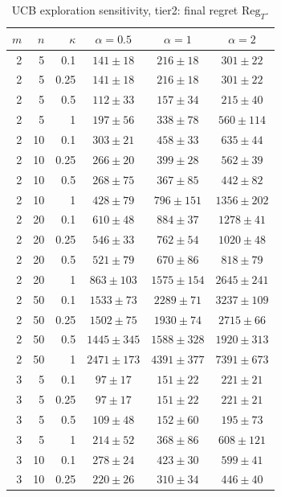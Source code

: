 \begin{table}[htbp]
\centering
\scriptsize
\caption{UCB exploration sensitivity, tier2: final regret $\mathrm{Reg}_T$.}
\label{tab:ucb_alpha_tier2_final_regret}
\begin{tabular}{@{}rrrccc@{}}
\toprule
$m$ & $n$ & $\kappa$ & $\alpha=0.5$ & $\alpha=1$ & $\alpha=2$ \\
\midrule
2 & 5 & 0.1 & $141 \pm 18$ & $216 \pm 18$ & $301 \pm 22$ \\
2 & 5 & 0.25 & $141 \pm 18$ & $216 \pm 18$ & $301 \pm 22$ \\
2 & 5 & 0.5 & $112 \pm 33$ & $157 \pm 34$ & $215 \pm 40$ \\
2 & 5 & 1 & $197 \pm 56$ & $338 \pm 78$ & $560 \pm 114$ \\
2 & 10 & 0.1 & $303 \pm 21$ & $458 \pm 33$ & $635 \pm 44$ \\
2 & 10 & 0.25 & $266 \pm 20$ & $399 \pm 28$ & $562 \pm 39$ \\
2 & 10 & 0.5 & $268 \pm 75$ & $367 \pm 85$ & $442 \pm 82$ \\
2 & 10 & 1 & $428 \pm 79$ & $796 \pm 151$ & $1356 \pm 202$ \\
2 & 20 & 0.1 & $610 \pm 48$ & $884 \pm 37$ & $1278 \pm 41$ \\
2 & 20 & 0.25 & $546 \pm 33$ & $762 \pm 54$ & $1020 \pm 48$ \\
2 & 20 & 0.5 & $521 \pm 79$ & $670 \pm 86$ & $818 \pm 79$ \\
2 & 20 & 1 & $863 \pm 103$ & $1575 \pm 154$ & $2645 \pm 241$ \\
2 & 50 & 0.1 & $1533 \pm 73$ & $2289 \pm 71$ & $3237 \pm 109$ \\
2 & 50 & 0.25 & $1502 \pm 75$ & $1930 \pm 74$ & $2715 \pm 66$ \\
2 & 50 & 0.5 & $1445 \pm 345$ & $1588 \pm 328$ & $1920 \pm 313$ \\
2 & 50 & 1 & $2471 \pm 173$ & $4391 \pm 377$ & $7391 \pm 673$ \\
\midrule
3 & 5 & 0.1 & $97 \pm 17$ & $151 \pm 22$ & $221 \pm 21$ \\
3 & 5 & 0.25 & $97 \pm 17$ & $151 \pm 22$ & $221 \pm 21$ \\
3 & 5 & 0.5 & $109 \pm 48$ & $152 \pm 60$ & $195 \pm 73$ \\
3 & 5 & 1 & $214 \pm 52$ & $368 \pm 86$ & $608 \pm 121$ \\
3 & 10 & 0.1 & $278 \pm 24$ & $423 \pm 30$ & $599 \pm 41$ \\
3 & 10 & 0.25 & $220 \pm 26$ & $310 \pm 34$ & $446 \pm 40$ \\

\end{tabular}
\end{table}
